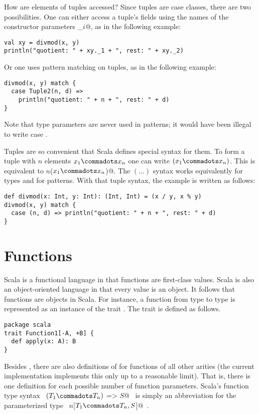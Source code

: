 How are elements of tuples accessed? Since tuples are case classes,
there are two possibilities. One can either access a tuple's fields
using the names of the constructor parameters \lstinline@_$i$@, as in the following example:
\begin{lstlisting}
val xy = divmod(x, y)
println("quotient: " + xy._1 + ", rest: " + xy._2)
\end{lstlisting}
Or one uses pattern matching on tuples, as in the following example:
\begin{lstlisting}
divmod(x, y) match {
  case Tuple2(n, d) =>
    println("quotient: " + n + ", rest: " + d)
}
\end{lstlisting}
Note that type parameters are never used in patterns; it would have
been illegal to write case .

Tuples are so convenient that Scala defines special syntax for
them. To form a tuple with $n$ elements $x_1 \commadots x_n$ one can
write $(x_1 \commadots x_n)$. This is equivalent to
\lstinline@Tuple$n$($x_1 \commadots x_n$)@. The $(...)$ syntax works
equivalently for types and for patterns. With that tuple syntax, the
\lstinline@divmod@ example is written as follows:
\begin{lstlisting}
def divmod(x: Int, y: Int): (Int, Int) = (x / y, x % y)
divmod(x, y) match {
  case (n, d) => println("quotient: " + n + ", rest: " + d)
}
\end{lstlisting}
\section{Functions}\label{sec:functions}

Scala is a functional language in that functions are first-class
values.  Scala is also an object-oriented language in that every value
is an object.  It follows that functions are objects in Scala.  For
instance, a function from type  to type  is
represented as an instance of the trait .
The  trait is defined as follows.
\begin{lstlisting}
package scala
trait Function1[-A, +B] {
  def apply(x: A): B
}
\end{lstlisting}
Besides , there are also definitions of for functions
of all other arities (the current implementation implements this only
up to a reasonable limit).  That is, there is one definition for each
possible number of function parameters.  Scala's function type syntax
~\lstinline@$(T_1 \commadots T_n)$ => $S$@~ is simply an abbreviation
for the parameterized type ~\lstinline@Function$n$[$T_1 \commadots
T_n, S$]@~.

